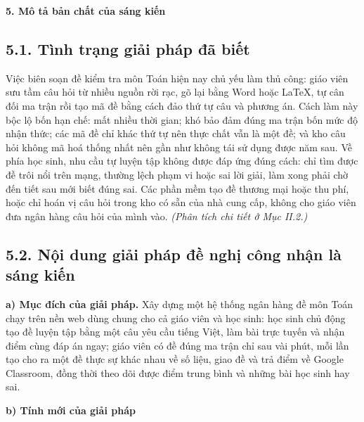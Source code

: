 \bigskip
\noindent\textbf{5. Mô tả bản chất của sáng kiến}

\subsection*{5.1. Tình trạng giải pháp đã biết}

Việc biên soạn đề kiểm tra môn Toán hiện nay chủ yếu làm thủ công: giáo viên
sưu tầm câu hỏi từ nhiều nguồn rời rạc, gõ lại bằng Word hoặc \LaTeX, tự cân
đối ma trận rồi tạo mã đề bằng cách đảo thứ tự câu và phương án. Cách làm này
bộc lộ bốn hạn chế: mất nhiều thời gian; khó bảo đảm đúng ma trận bốn mức độ
nhận thức; các mã đề chỉ khác thứ tự nên thực chất vẫn là một đề; và kho câu
hỏi không mã hoá thống nhất nên gần như không tái sử dụng được năm sau. Về phía
học sinh, nhu cầu tự luyện tập không được đáp ứng đúng cách: chỉ tìm được đề
trôi nổi trên mạng, thường lệch phạm vi hoặc sai lời giải, làm xong phải chờ
đến tiết sau mới biết đúng sai. Các phần mềm tạo đề thương mại hoặc thu phí,
hoặc chỉ hoán vị câu hỏi trong kho có sẵn của nhà cung cấp, không cho giáo viên
đưa ngân hàng câu hỏi của mình vào. \textit{(Phân tích chi tiết ở Mục II.2.)}

\subsection*{5.2. Nội dung giải pháp đề nghị công nhận là sáng kiến}

\textbf{a) Mục đích của giải pháp.} Xây dựng một hệ thống ngân hàng đề môn Toán
chạy trên nền web dùng chung cho cả giáo viên và học sinh: học sinh chủ động tạo
đề luyện tập bằng một câu yêu cầu tiếng Việt, làm bài trực tuyến và nhận điểm
cùng đáp án ngay; giáo viên có đề đúng ma trận chỉ sau vài phút, mỗi lần tạo cho
ra một đề thực sự khác nhau về số liệu, giao đề và trả điểm về Google Classroom,
đồng thời theo dõi được điểm trung bình và những bài học sinh hay sai.

\textbf{b) Tính mới của giải pháp}

